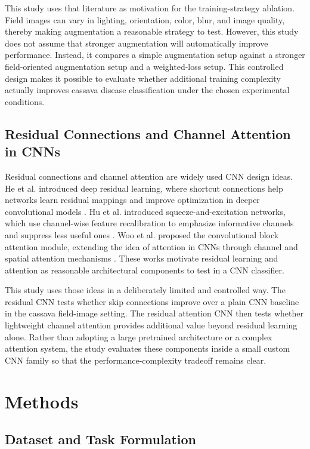 \documentclass[11pt]{article}
\begin{document}
This study uses that literature as motivation for the training-strategy ablation. Field images can vary in lighting, orientation, color, blur, and image quality, thereby making augmentation a reasonable strategy to test. However, this study does not assume that stronger augmentation will automatically improve performance. Instead, it compares a simple augmentation setup against a stronger field-oriented augmentation setup and a weighted-loss setup. This controlled design makes it possible to evaluate whether additional training complexity actually improves cassava disease classification under the chosen experimental conditions.

\subsection{Residual Connections and Channel Attention in CNNs}

Residual connections and channel attention are widely used CNN design ideas. He et al. introduced deep residual learning, where shortcut connections help networks learn residual mappings and improve optimization in deeper convolutional models \cite{he2016}. Hu et al. introduced squeeze-and-excitation networks, which use channel-wise feature recalibration to emphasize informative channels and suppress less useful ones \cite{hu2018}. Woo et al. proposed the convolutional block attention module, extending the idea of attention in CNNs through channel and spatial attention mechanisms \cite{woo2018}. These works motivate residual learning and attention as reasonable architectural components to test in a CNN classifier.

This study uses those ideas in a deliberately limited and controlled way. The residual CNN tests whether skip connections improve over a plain CNN baseline in the cassava field-image setting. The residual attention CNN then tests whether lightweight channel attention provides additional value beyond residual learning alone. Rather than adopting a large pretrained architecture or a complex attention system, the study evaluates these components inside a small custom CNN family so that the performance-complexity tradeoff remains clear.


\section{Methods}

\subsection{Dataset and Task Formulation}
\end{document}
